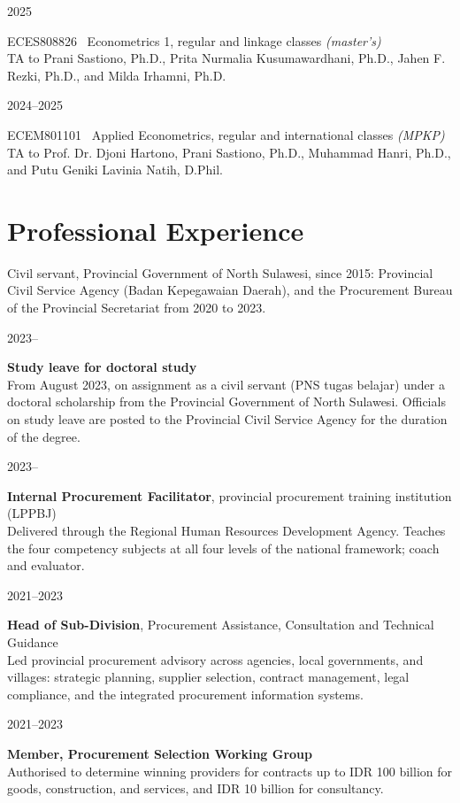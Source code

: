 \documentclass[11pt,a4paper]{article}
\newlength{\datecol}\setlength{\datecol}{0.155\textwidth}
\newlength{\bodycol}\setlength{\bodycol}{0.815\textwidth}
\newcommand{\entry}[2]{%
  \noindent
  \begin{minipage}[t]{\datecol}%
    \strut\raggedright\small\color{muted}#1%
  \end{minipage}%
  \hfill
  \begin{minipage}[t]{\bodycol}%
    \strut #2%
  \end{minipage}%
  \par\vspace{0.16em}}
\newcommand{\fentry}[1]{\noindent#1\par\vspace{0.16em}}
\newcommand{\org}[1]{{\small\color{muted}#1}}
\begin{document}
\entry{2025}{ECES808826 \textperiodcentered\ Econometrics 1, regular and
  linkage classes \emph{(master's)}\\
  \org{TA to Prani Sastiono, Ph.D., Prita Nurmalia Kusumawardhani, Ph.D.,
  Jahen F. Rezki, Ph.D., and Milda Irhamni, Ph.D.}}

\entry{2024--2025}{ECEM801101 \textperiodcentered\ Applied Econometrics,
  regular and international classes \emph{(MPKP)}\\
  \org{TA to Prof. Dr. Djoni Hartono, Prani Sastiono, Ph.D., Muhammad Hanri,
  Ph.D., and Putu Geniki Lavinia Natih, D.Phil.}}

\section{Professional Experience}

\fentry{Civil servant, Provincial Government of North Sulawesi, since 2015:
  Provincial Civil Service Agency (Badan Kepegawaian Daerah), and the
  Procurement Bureau of the Provincial Secretariat from 2020 to 2023.}

\vspace{0.35em}

\entry{2023--}{\textbf{Study leave for doctoral study}\\
  \org{From August 2023, on assignment as a civil servant (PNS tugas belajar)
  under a doctoral scholarship from the Provincial Government of North
  Sulawesi. Officials on study leave are posted to the Provincial Civil Service
  Agency for the duration of the degree.}}

\entry{2023--}{\textbf{Internal Procurement Facilitator}, provincial
  procurement training institution (LPPBJ)\\
  \org{Delivered through the Regional Human Resources Development Agency.
  Teaches the four competency subjects at all four levels of the national
  framework; coach and evaluator.}}

\entry{2021--2023}{\textbf{Head of Sub-Division}, Procurement Assistance,
  Consultation and Technical Guidance\\
  \org{Led provincial procurement advisory across agencies, local governments,
  and villages: strategic planning, supplier selection, contract management,
  legal compliance, and the integrated procurement information systems.}}

\entry{2021--2023}{\textbf{Member, Procurement Selection Working Group}\\
  \org{Authorised to determine winning providers for contracts up to
  IDR 100 billion for goods, construction, and services, and IDR 10 billion for
  consultancy.}}
\end{document}
